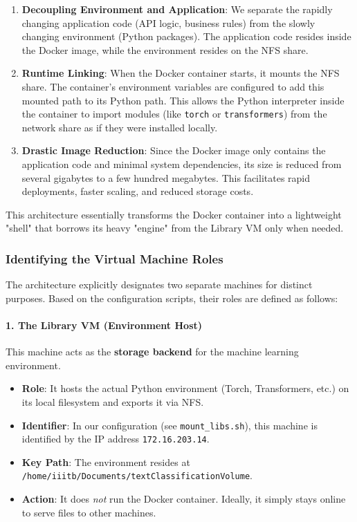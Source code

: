 \documentclass{ieeeaccess}
\begin{document}
\begin{enumerate}
    \item \textbf{Decoupling Environment and Application}: We separate the rapidly changing application code (API logic, business rules) from the slowly changing environment (Python packages). The application code resides inside the Docker image, while the environment resides on the NFS share.
    \item \textbf{Runtime Linking}: When the Docker container starts, it mounts the NFS share. The container's environment variables are configured to add this mounted path to its Python path. This allows the Python interpreter inside the container to import modules (like \texttt{torch} or \texttt{transformers}) from the network share as if they were installed locally.
    \item \textbf{Drastic Image Reduction}: Since the Docker image only contains the application code and minimal system dependencies, its size is reduced from several gigabytes to a few hundred megabytes. This facilitates rapid deployments, faster scaling, and reduced storage costs.
\end{enumerate}

This architecture essentially transforms the Docker container into a lightweight "shell" that borrows its heavy "engine" from the Library VM only when needed.

\subsubsection{Identifying the Virtual Machine Roles}

The architecture explicitly designates two separate machines for distinct purposes. Based on the configuration scripts, their roles are defined as follows:

\paragraph{1. The Library VM (Environment Host)}
This machine acts as the \textbf{storage backend} for the machine learning environment.
\begin{itemize}
    \item \textbf{Role}: It hosts the actual Python environment (Torch, Transformers, etc.) on its local filesystem and exports it via NFS.
    \item \textbf{Identifier}: In our configuration (see \texttt{mount\_libs.sh}), this machine is identified by the IP address \texttt{172.16.203.14}.
    \item \textbf{Key Path}: The environment resides at \texttt{/home/iiitb/Documents/textClassificationVolume}.
    \item \textbf{Action}: It does \textit{not} run the Docker container. Ideally, it simply stays online to serve files to other machines.
\end{itemize}
\end{document}
